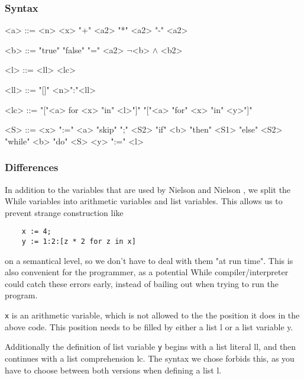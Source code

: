 \documentclass[12pt]{article}
\newcommand\mono\texttt
\newcommand{\metavar}[1]{\textlangle#1\textrangle}
\begin{document}
\subsubsection{Syntax}

\begin{grammar}
    <a> ::= <n>
    \alt <x>
     "+" <a2>
     "*" <a2>
     "-" <a2>

    <b> ::= "true"
    \alt "false"
     "=" <a2>
    \alt $\lnot$<b>
     $\land$ <b2>

    <l> ::= <ll>
    \alt <lc>

    <ll> ::= "[]"
    \alt <n>":"<ll>

    <lc> ::= "["<a> for <x> "in" <l>"]"
    \alt "["<a> "for" <x> "in" <y>"]"

    <S> ::= <x> ":=" <a>
    \alt "skip"
     ";" <S2>
    \alt "if" <b> "then" <S1> "else" <S2>
    \alt "while" <b> "do" <S>
    \alt <y> ":=" <l>
\end{grammar}

\subsubsection{Differences}

In addition to the variables that are used by Nielson and Nielson \cite{wiley}, we split the While variables into arithmetic variables and list variables. This allows us to prevent strange construction like

\begin{lstlisting}
    x := 4;
    y := 1:2:[z * 2 for z in x]
\end{lstlisting}

on a semantical level, so we don't have to deal with them "at run time". This is also convenient for the programmer, as a potential While compiler/interpreter could catch these errors early, instead of bailing out when trying to run the program.

\mono{x} is an arithmetic variable, which is not allowed to the the position it does in the above code. This position needs to be filled by either a list \metavar{l} or a list variable \metavar{y}.

Additionally the definition of list variable \mono{y} begins with a list literal \metavar{ll}, and then continues with a list comprehension \metavar{lc}. The syntax we chose forbids this, as you have to choose between both versions when defining a list \metavar{l}.
\end{document}
